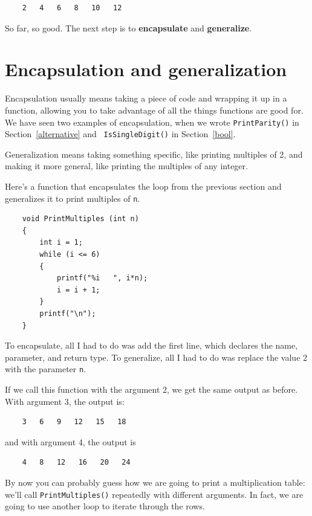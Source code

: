 \begin{verbatim}
    2   4   6   8   10   12
\end{verbatim}
%
So far, so good.  The next step is to {\bf encapsulate} and {\bf
generalize}.

\section {Encapsulation and generalization}

Encapsulation usually means taking a piece of code and wrapping it up
in a function, allowing you to take advantage of all the things functions
are good for.  We have seen two examples of encapsulation, when we
wrote {\tt PrintParity()} in Section~\ref{alternative} and {\tt
IsSingleDigit()} in Section~\ref{bool}.

Generalization means taking something specific, like printing
multiples of 2, and making it more general, like printing the
multiples of any integer.


Here's a function that encapsulates the loop from the previous
section and generalizes it to print multiples of {\tt n}.

\begin{verbatim}
    void PrintMultiples (int n)
    {
        int i = 1;
        while (i <= 6) 
        {
            printf("%i   ", i*n);
            i = i + 1;
        }
        printf("\n");
    }
\end{verbatim}
%
To encapsulate, all I had to do was add the first line,
which declares the name, parameter,
and return type.  To generalize, all I had to do was replace
the value 2 with the parameter {\tt n}.

If we call this function with the argument 2, we get the same
output as before.  With argument 3, the output is:

\begin{verbatim}
    3   6   9   12   15   18
\end{verbatim}
%
and with argument 4, the output is

\begin{verbatim}
    4   8   12   16   20   24 
\end{verbatim}
%
By now you can probably guess how we are going to print a
multiplication table: we'll call {\tt PrintMultiples()} repeatedly with
different arguments.  In fact, we are going to use another loop to
iterate through the rows.

